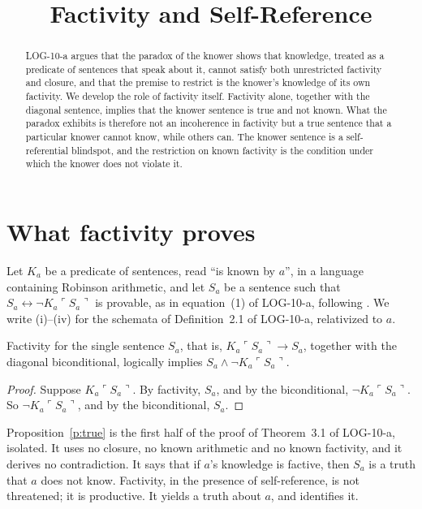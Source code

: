 \documentclass{situationist-preprint}
\title{Factivity and Self-Reference}
\begin{document}
\maketitle

\begin{abstract}
LOG-10-a argues that the paradox of the knower shows that knowledge, treated as a predicate of sentences that speak about it, cannot satisfy both unrestricted factivity and closure, and that the premise to restrict is the knower's knowledge of its own factivity. We develop the role of factivity itself. Factivity alone, together with the diagonal sentence, implies that the knower sentence is true and not known. What the paradox exhibits is therefore not an incoherence in factivity but a true sentence that a particular knower cannot know, while others can. The knower sentence is a self-referential blindspot, and the restriction on known factivity is the condition under which the knower does not violate it.
\end{abstract}

\section{What factivity proves}

Let $K_a$ be a predicate of sentences, read \enquote{is known by $a$}, in a language containing Robinson arithmetic, and let $S_a$ be a sentence such that $S_a \leftrightarrow \neg K_a\ulcorner S_a\urcorner$ is provable, as in equation~(1) of LOG-10-a, following \citet{KaplanMontague1960}. We write (i)--(iv) for the schemata of Definition~2.1 of LOG-10-a, relativized to $a$.

\begin{proposition}\label{p:true}
Factivity for the single sentence $S_a$, that is, $K_a\ulcorner S_a\urcorner \rightarrow S_a$, together with the diagonal biconditional, logically implies $S_a \wedge \neg K_a\ulcorner S_a\urcorner$.
\end{proposition}

\begin{proof}
Suppose $K_a\ulcorner S_a\urcorner$. By factivity, $S_a$, and by the biconditional, $\neg K_a\ulcorner S_a\urcorner$. So $\neg K_a\ulcorner S_a\urcorner$, and by the biconditional, $S_a$.
\end{proof}

Proposition~\ref{p:true} is the first half of the proof of Theorem~3.1 of LOG-10-a, isolated. It uses no closure, no known arithmetic and no known factivity, and it derives no contradiction. It says that if $a$'s knowledge is factive, then $S_a$ is a truth that $a$ does not know. Factivity, in the presence of self-reference, is not threatened; it is productive. It yields a truth about $a$, and identifies it.
\end{document}
